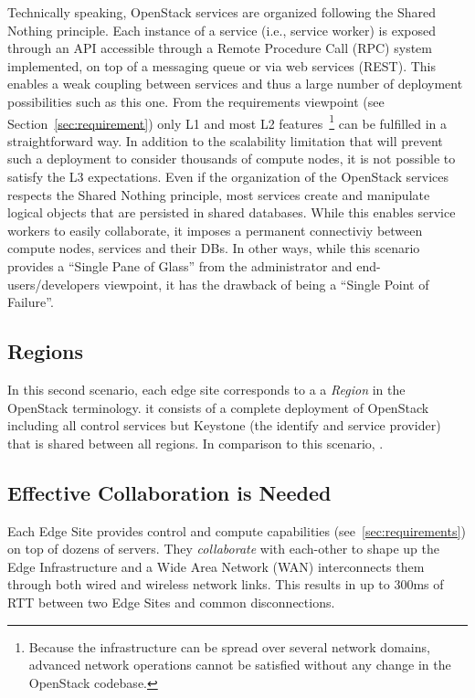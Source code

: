 %
Technically speaking, OpenStack services are organized following the
Shared Nothing principle. Each instance of a service (i.e., service
worker) is exposed through an API accessible through a Remote
Procedure Call (RPC) system implemented, on top of a messaging queue
or via web services (REST). This enables a weak coupling between
services and thus a large number of deployment possibilities such as
this one.
%
From the requirements viewpoint (see Section~\ref{sec:requirement}) only L1
and most L2 features~\footnote{Because the infrastructure can
  be spread over several network domains, advanced network operations
  cannot be satisfied without any change in the OpenStack codebase.}
can be fulfilled in a straightforward way.  In addition to
the scalability limitation that will prevent such a deployment to 
consider thousands of compute nodes, it is not possible to satisfy the
L3 expectations.
%
Even if the organization of the OpenStack services respects the Shared
Nothing principle, most services create and manipulate logical objects
that are persisted in shared databases. While this enables service
workers to easily collaborate, it imposes a permanent connectiviy
between compute nodes, services and their DBs. In other ways, while
this scenario provides a ``Single Pane of Glass'' from the
administrator and end-users/developers viewpoint, it has the drawback
of being a ``Single Point of Failure''.


\subsection{Regions}
In this second scenario, each edge site corresponds to a a
\emph{Region} in the OpenStack terminology. it consists of a complete
deployment of OpenStack including all control services but Keystone
(\ie the identify and service provider) that is shared between all
regions.
In comparison to this scenario, .


\subsection{Effective Collaboration is Needed}
Each Edge Site
provides control and compute capabilities (see~\ref{sec:requirements})
on top of dozens of servers. They \emph{collaborate} with each-other
to shape up the Edge Infrastructure and a Wide Area Network (WAN)
interconnects them through both wired and wireless network links. This
results in up to 300ms of RTT between two Edge Sites and common
disconnections.

